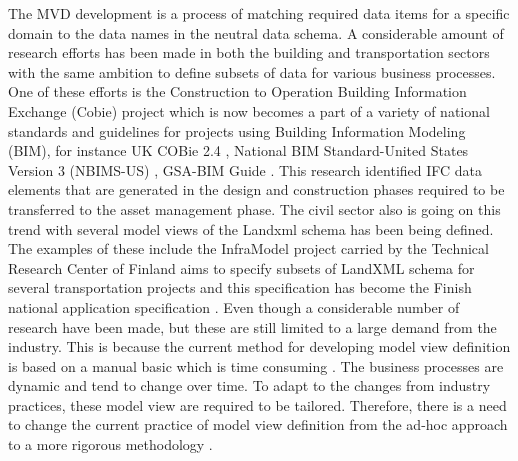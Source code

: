 \documentclass[Journal, InsideFigs, DoubleSpace]{ascelike} %
\begin{document}
The MVD development is a process of matching required data items for a specific domain to the data names in the neutral data schema. A considerable amount of research efforts has been made in both the building and transportation sectors with the same ambition to define subsets of data for various business processes. One of these efforts is the Construction to Operation Building Information Exchange (Cobie) project \cite{east07} which is now becomes a part of a variety of national standards and guidelines for projects using Building Information Modeling (BIM), for instance UK COBie 2.4 \cite{nisbet12}, National BIM Standard-United States Version 3 (NBIMS-US) \cite{nibs15}, GSA-BIM Guide \cite{gsa11}. This research identified IFC data elements that are generated in the design and construction phases required to be transferred to the asset management phase. The civil sector also is going on this trend with several model views of the Landxml schema has been being defined. The examples of these include the InfraModel project carried by the Technical Research Center of Finland aims to specify subsets of LandXML schema for several transportation projects and this specification has become the Finish national application specification \cite{inframodel14}. Even though a considerable number of research have been made, but these are still limited to a large demand from the industry. This is because the current method for developing model view definition is based on a manual basic which is time consuming \cite{venugopal12,eastman12,hu14}. The business processes are dynamic and tend to change over time. To adapt to the changes from industry practices, these model view are required to be tailored. Therefore, there is a need to change the current practice of model view definition from the ad-hoc approach to a more rigorous methodology \cite{venugopal12}. 
\par
\end{document}
